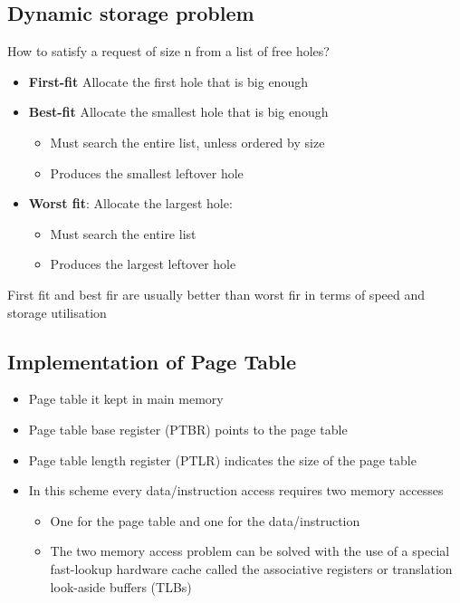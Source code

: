 \documentclass{article}[18pt]
\begin{document}
\subsection{Dynamic storage problem}
How to satisfy a request of size n from a list of free holes?
\begin{itemize}
	\item \textbf{First-fit} Allocate the first hole that is big enough
	\item \textbf{Best-fit} Allocate the smallest hole that is big enough
	\begin{itemize}
		\item Must search the entire list, unless ordered by size
		\item Produces the smallest leftover hole
	\end{itemize}
	\item \textbf{Worst fit}: Allocate the largest hole:
	\begin{itemize}
		\item Must search the entire list
		\item Produces the largest leftover hole
	\end{itemize}
\end{itemize}
First fit and best fir are usually better than worst fir in terms of speed and storage utilisation


\subsection{Implementation of Page Table}
\begin{itemize}
	\item Page table it kept in main memory
	\item Page table base register (PTBR) points to the page table
	\item Page table length register (PTLR) indicates the size of the page table
	\item In this scheme every data/instruction access requires two memory accesses
	\begin{itemize}
		\item One for the page table and one for the data/instruction
		\item The two memory access problem can be solved with the use of a special fast-lookup hardware cache called the associative registers or translation look-aside buffers (TLBs)
	\end{itemize} 
\end{itemize}
\end{document}
